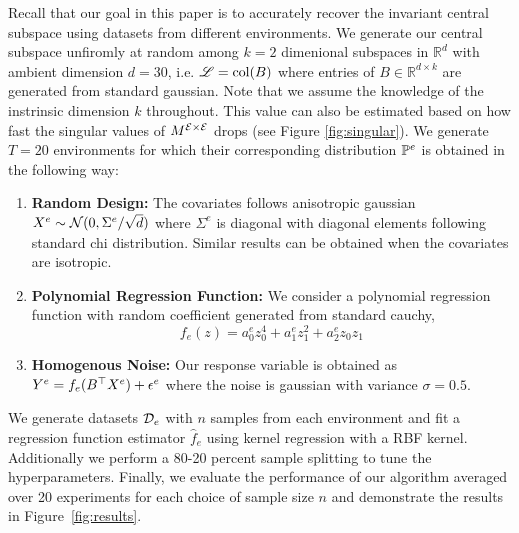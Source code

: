 Recall that our goal in this paper is to accurately recover the invariant central subspace using datasets from different environments. 
We generate our central subspace unfiromly at random among $k=2$ dimenional subspaces in $\mathbb{R}^{d}$ with ambient dimension $d = 30$, i.e. $\mathscr{L} = \col(B)$ where entries of $B \in \mathbb{R}^{d \times k}$ are generated from standard gaussian. 
Note that we assume the knowledge of the instrinsic dimension $k$ throughout. This value can also be estimated based on how fast the singular values of $M^{\environments \times \environments}$ drops (see Figure \ref{fig:singular}). 
We generate $T = 20$ environments for which their corresponding distribution $\probability[e]$ is obtained in the following way:
\begin{enumerate}
    \item \textbf{Random Design:} The covariates follows anisotropic gaussian $X^{e} \sim \mathcal{N}(0, \fracl{\Sigma^e}{\sqrt{d}})$ where $\Sigma^e$ is diagonal with diagonal elements following standard chi distribution.
    Similar results can be obtained when the covariates are isotropic. 
    \item \textbf{Polynomial Regression Function:} We consider a polynomial regression function with random coefficient generated from standard cauchy,
    $$ f_e(z) = a_0^e z_0^4 + a_1^e z_1^2 + a_2^e z_0 z_1$$
    \item \textbf{Homogenous Noise:} Our response variable is obtained as $Y^e = f_e(B^{\T} X^{e}) + \epsilon^e$ where the noise is gaussian with variance $\sigma = 0.5$.
\end{enumerate}
We generate datasets $\dataset[e]$ with $n$ samples from each environment and fit a regression function estimator $\hat{f}_e$ using kernel regression with a RBF kernel. Additionally we perform a 80-20 percent sample splitting to tune the hyperparameters.
Finally, we evaluate the performance of our algorithm averaged over 20 experiments for each choice of sample size $n$ and demonstrate the results in Figure~\ref{fig:results}.

